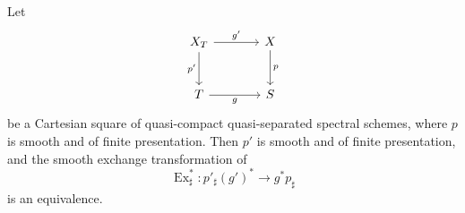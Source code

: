 \begin{theorem}
\label{thm:unstable-smooth-base-change}
Let
\[
\begin{tikzcd}[column sep=large, row sep=large]
    X_T
        \arrow[r, "g'"]
        \arrow[d, "p'"']
    &
    X
        \arrow[d, "p"]
    \\
    T
        \arrow[r, "g"']
    &
    S
\end{tikzcd}
\]
be a Cartesian square of quasi-compact quasi-separated spectral schemes,
where \(p\) is smooth and of finite presentation. Then \(p'\) is smooth
and of finite presentation, and the smooth exchange transformation of
\[
    \operatorname{Ex}_{\sharp}^{*}
    \colon
    p'_\sharp(g')^*
    \longrightarrow
    g^*p_\sharp
\]
is an equivalence.
\end{theorem}

